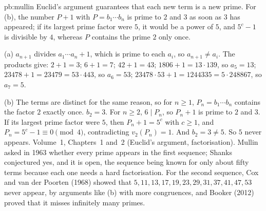 \begin{solution}{pb:mullin}
\idea Euclid's argument guarantees that each new term is a new prime. For (b), the number $P+1$ with $P=b_1\cdots b_n$ is prime to
$2$ and $3$ as soon as $3$ has appeared; if its largest prime factor were $5$, it would be a power of $5$, and $5^c-1$ is
divisible by $4$, whereas $P$ contains the prime $2$ only once.

\writeup (a) $a_{n+1}$ divides $a_1\cdots a_n+1$, which is prime to each $a_i$, so $a_{n+1}\ne a_i$. The products give:
$2+1=3$; $6+1=7$; $42+1=43$; $1806+1=13\cdot139$, so $a_5=13$; $23478+1=23479=53\cdot443$, so $a_6=53$;
$23478\cdot53+1=1244335=5\cdot248867$, so $a_7=5$.

(b) The terms are distinct for the same reason, so for $n\ge1$, $P_n=b_1\cdots b_n$ contains the factor $2$ exactly once. $b_2=3$. For
$n\ge2$, $6\mid P_n$, so $P_n+1$ is prime to $2$ and $3$. If its largest prime factor were $5$, then $P_n+1=5^c$ with $c\ge1$, and
$P_n=5^c-1\equiv0\pmod4$, contradicting $v_2(P_n)=1$. And $b_2=3\ne5$. So $5$ never appears.
\tools Volume~1, Chapters~1 and~2 (Euclid's argument, factorisation).
\leads Mullin asked in 1963 whether every prime appears in the first sequence; Shanks conjectured yes, and it is open, the
sequence being known for only about fifty terms because each one needs a hard factorisation. For the second sequence, Cox and
van der Poorten (1968) showed that $5,11,13,17,19,23,29,31,37,41,47,53$ never appear, by arguments like (b) with more
congruences, and Booker (2012) proved that it misses infinitely many primes.
\end{solution}

